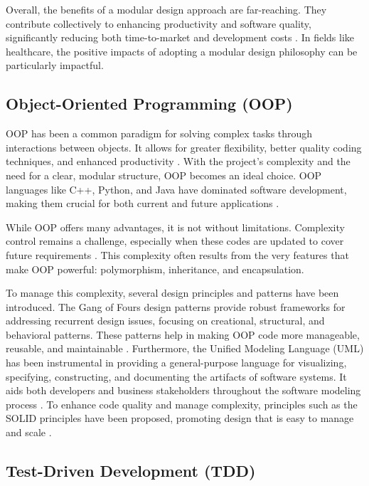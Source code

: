 Overall, the benefits of a modular design approach are far-reaching.
They contribute collectively to enhancing productivity and software
quality, significantly reducing both time-to-market and development
costs \cite{19}. In fields
like healthcare, the positive impacts of adopting a modular design
philosophy can be particularly impactful.

\subsection{Object-Oriented Programming
(OOP)}\label{object-oriented-programming-oop}

OOP has been a common paradigm for solving complex tasks through
interactions between objects. It allows for greater flexibility, better
quality coding techniques, and enhanced productivity
\cite{21}\cite{22}. With the
project's complexity and the need for a clear, modular structure, OOP
becomes an ideal choice. OOP languages like C++, Python, and Java have
dominated software development, making them crucial for both current and
future applications
\cite{23}\cite{24}.

While OOP offers many advantages, it is not without limitations.
Complexity control remains a challenge, especially when these codes are
updated to cover future requirements
\cite{21}\cite{25}. This
complexity often results from the very features that make OOP powerful:
polymorphism, inheritance, and encapsulation.

To manage this complexity, several design principles and patterns have
been introduced. The Gang of Four\textquotesingle s design patterns
provide robust frameworks for addressing recurrent design issues,
focusing on creational, structural, and behavioral patterns. These
patterns help in making OOP code more manageable, reusable, and
maintainable \cite{26}.
Furthermore, the Unified Modeling Language (UML) has been instrumental
in providing a general-purpose language for visualizing, specifying,
constructing, and documenting the artifacts of software systems. It aids
both developers and business stakeholders throughout the software
modeling process \cite{27}.
To enhance code quality and manage complexity, principles such as the
SOLID principles have been proposed, promoting design that is easy to
manage and scale
\cite{24}\cite{28}.

\subsection{Test-Driven Development
(TDD)}\label{test-driven-development-tdd}

